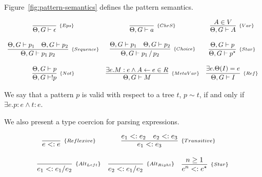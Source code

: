 Figure~\ref{fig:pattern-semantics} defines the pattern semantics.

\begin{figure*}[!ht]
    \[
        \begin{array}{ccc}
            \infer[_{\{Eps\}}]{\Theta, G \vdash \epsilon}{} &
            \infer[_{\{ChrS\}}]{\Theta, G \vdash a}{} &
            \infer[_{\{Var\}}]{\Theta, G \vdash A}{A \in V}
            \\ \\
            \infer[_{\{Sequence\}}]{\Theta, G \vdash p_1\:p_2}{\Theta, G \vdash p_1 & \Theta, G \vdash p_2} &
            \infer[_{\{Choice\}}]{\Theta, G \vdash p_1 \,/\, p_2}{\Theta, G \vdash p_1 & \Theta, G \vdash p_2} &
            \infer[_{\{Star\}}]{\Theta, G \vdash p^\star}{\Theta, G \vdash p}
            \\ \\
            \infer[_{\{Not\}}]{\Theta, G \vdash !p}{\Theta, G \vdash p} &
            \infer[_{\{MetaVar\}}]{\Theta, G \vdash M}{\exists e. M : e \land A \leftarrow e \in R} &
            \infer[_{\{Ref\}}]{\Theta, G \vdash I}{\exists e. \Theta(I) = e}
        \end{array}
    \]
    \centering
    \caption{Patterns semantics.}
    \label{fig:pattern-semantics}
\end{figure*}

\begin{definition}
    We say that a pattern \(p\) is valid with respect to a tree \(t\), \(p \sim t\),
    if and only if \(\exists e . p : e \land t : e\).
\end{definition}

We also present a type coercion for parsing expressions.
\begin{figure*}[ht]
    \[
        \begin{array}{ccc}
            \infer[_{\{Reflexive\}}]{e <: e}{} &
            \multicolumn{2}{c}{
                \infer[_{\{Transitive\}}]{e_1 <: e_3}{e_1 <: e_2 & e_2 <: e_3}
            } \\ \\

            \infer[_{\{Alt_{Left}\}}]{e_1 <: e_1 / e_2}{} &
            \infer[_{\{Alt_{Right}\}}]{e_2 <: e_1 / e_2}{} &
            \infer[_{\{Star\}}]{e^n <: e^\star}{n \geq 1}
        \end{array}
    \]
    \centering
    \caption{Subtype relations for parsing expressions}
    \label{fig:subtype-relations}
\end{figure*}

